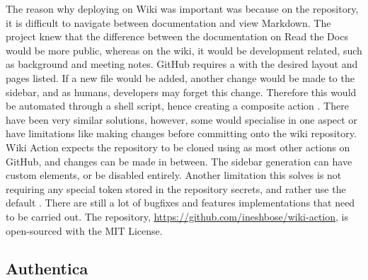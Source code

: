 \documentclass[../main.tex]{subfiles}
\begin{document}
The reason why deploying on Wiki was important was because on the repository, it is difficult to navigate between documentation and view Markdown. The project knew that the difference between the documentation on Read the Docs would be more public, whereas on the wiki, it would be development related, such as background and meeting notes. GitHub requires a  \cite{CreatingFooterSidebar} with the desired layout and pages listed. If a new file would be added, another change would be made to the sidebar, and as humans, developers may forget this change. Therefore this would be automated through a shell script, hence creating a composite action \cite{CreatingCompositeAction}. There have been very similar solutions, however, some would specialise in one aspect or have limitations like making changes before committing onto the wiki repository. Wiki Action expects the repository to be cloned using  as most other actions on GitHub, and changes can be made in between. The sidebar generation can have custom elements, or be disabled entirely. Another limitation this solves is not requiring any special token stored in the repository secrets, and rather use the default . There are still a lot of bugfixes and features implementations that need to be carried out. The repository, \href{https://github.com/ineshbose/wiki-action}{https://github.com/ineshbose/wiki-action}, is open-sourced with the MIT License.

\subsection{Authentica}
\end{document}
